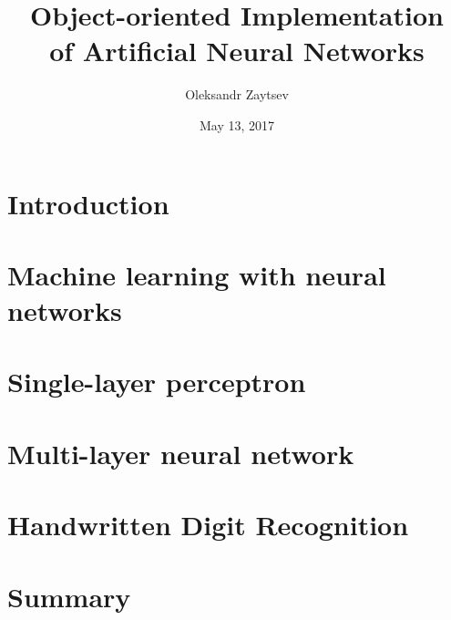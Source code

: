 \documentclass[a4paper, 12pt, oneside]{book}
\title{Object-oriented Implementation \\
       of Artificial Neural Networks}
\date{May 13, 2017}
\author{Oleksandr Zaytsev}
\begin{document}
  \maketitle
  \tableofcontents
  
  \chapter{Introduction}
  
  
  \chapter{Machine learning with neural networks}
  
  
  \chapter{Single-layer perceptron}
  
  
  \chapter{Multi-layer neural network}
  
  
  \chapter{Handwritten Digit Recognition}
  
  
  \chapter*{Summary}
  
  
  \nocite{Hassoun-1995}
  \nocite{Bishop-2006}
  \nocite{Rumelhart-et-al-1986}
  \nocite{PBE1}
  \nocite{PharoNum}
  \nocite{Bergel}
  \nocite{BlueBook}
  
%   
  
  
  \begin{otherlanguage}{ukrainian}
    \renewcommand\bibname{Bibliography}
    
  \end{otherlanguage}
\end{document}
